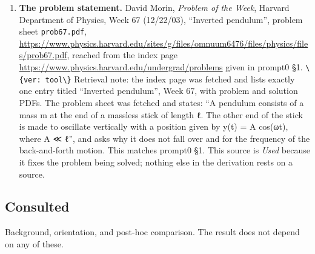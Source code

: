 \documentclass[11pt,a4paper]{article}
\providecommand{\passthrough}[1]{#1}
\providecommand{\tightlist}{\setlength{\itemsep}{0pt}\setlength{\parskip}{0pt}}
\begin{document}
\begin{enumerate}
\def\labelenumi{\arabic{enumi}.}
\tightlist
\item
  \textbf{The problem statement.} David Morin, \textit{Problem of the Week}, Harvard
  Department of Physics, Week 67 (12/22/03), ``Inverted pendulum'', problem sheet
  \passthrough{\lstinline!prob67.pdf!},
  \url{https://www.physics.harvard.edu/sites/g/files/omnuum6476/files/physics/files/prob67.pdf},
  reached from the index page \url{https://www.physics.harvard.edu/undergrad/problems}
  given in prompt0 §1. \passthrough{\lstinline!\{ver: tool\}!} Retrieval note: the index page was fetched
  and lists exactly one entry titled ``Inverted pendulum'', Week 67, with problem
  and solution PDFs. The problem sheet was fetched and states: ``A pendulum
  consists of a mass m at the end of a massless stick of length ℓ. The other end
  of the stick is made to oscillate vertically with a position given by
  y(t) = A cos(ωt), where A ≪ ℓ'', and asks why it does not fall over and for
  the frequency of the back-and-forth motion. This matches prompt0 §1. This
  source is \textit{Used} because it fixes the problem being solved; nothing else in
  the derivation rests on a source.
\end{enumerate}

\hypertarget{consulted}{%
\subsection{Consulted}\label{consulted}}

Background, orientation, and post-hoc comparison. The result does not depend on
any of these.
\end{document}
